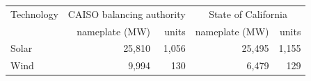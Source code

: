 \begin{tabular}{lrrrr}
\toprule
Technology & \multicolumn{2}{c}{CAISO balancing authority} & \multicolumn{2}{c}{State of California} \\
 & nameplate (MW) & units & nameplate (MW) & units \\
\midrule
Solar & 25,810 & 1,056 & 25,495 & 1,155 \\
Wind & 9,994 & 130 & 6,479 & 129 \\
\bottomrule
\end{tabular}